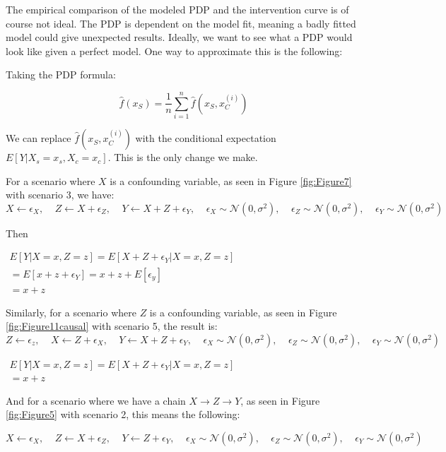 \documentclass[
]{krantz}
\begin{document}
The empirical comparison of the modeled PDP and the intervention curve is of course not ideal. The PDP is dependent on the model fit, meaning a badly fitted model could give unexpected results. Ideally, we want to see what a PDP would look like given a perfect model. One way to approximate this is the following:

Taking the PDP formula:

\[ \hat{f}(x_S) = \frac{1}{n} \sum_{i=1}^n \hat{f} (x_S, x_{C}^{(i)})\]

We can replace \(\hat{f} (x_S, x_{C}^{(i)})\) with the conditional expectation \(E[Y|X_s = x_s, X_c = x_c]\). This is the only change we make.

For a scenario where \(X\) is a confounding variable, as seen in Figure \ref{fig:Figure7} with scenario 3, we have:\\
\[  X \leftarrow  \epsilon_X , \ \ \ \ \ Z \leftarrow X + \epsilon_Z, \ \ \ \ \ Y \leftarrow X + Z + \epsilon_Y, \ \ \ \ \ \epsilon_X \sim \mathcal{N}(0, \sigma^2), \ \ \ \ \ \epsilon_Z \sim \mathcal{N}(0, \sigma^2), \ \ \ \ \ \epsilon_Y \sim \mathcal{N}(0, \sigma^2) \]

Then

\(\begin{aligned} E[Y|X = x, Z = z] = E[X+Z + \epsilon_Y| X = x, Z = z]\\  =E[x+z+\epsilon_Y] = x + z + E[\epsilon_y]\\  = x + z \end{aligned}\)

Similarly, for a scenario where \(Z\) is a confounding variable, as seen in Figure \ref{fig:Figure11causal} with scenario 5, the result is:\\
\[  Z \leftarrow  \epsilon_z , \ \ \ \ \ X \leftarrow Z + \epsilon_X, \ \ \ \ \ Y \leftarrow X + Z + \epsilon_Y, \ \ \ \ \ \epsilon_X \sim \mathcal{N}(0, \sigma^2), \ \ \ \ \ \epsilon_Z \sim \mathcal{N}(0, \sigma^2), \ \ \ \ \ \epsilon_Y \sim \mathcal{N}(0, \sigma^2) \]

\(\begin{aligned} E[Y|X = x, Z = z] = E[X+Z + \epsilon_Y| X = x, Z = z]\\ = x + z \end{aligned}\)

And for a scenario where we have a chain \(X \rightarrow Z \rightarrow Y\), as seen in Figure \ref{fig:Figure5} with scenario 2, this means the following:

\[  X \leftarrow  \epsilon_X , \ \ \ \ \ Z \leftarrow X + \epsilon_Z, \ \ \ \ \ Y \leftarrow Z + \epsilon_Y, \ \ \ \ \ \epsilon_X \sim \mathcal{N}(0, \sigma^2), \ \ \ \ \ \epsilon_Z \sim \mathcal{N}(0, \sigma^2), \ \ \ \ \ \epsilon_Y \sim \mathcal{N}(0, \sigma^2) \]
\end{document}
